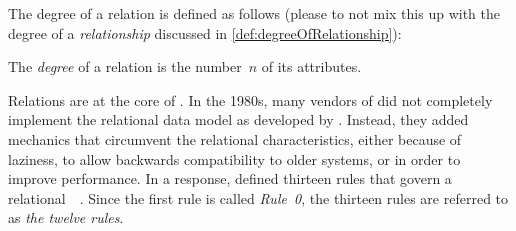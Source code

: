 The degree of a relation is defined as follows (please to not mix this up with the degree of a \emph{relationship} discussed in \cref{def:degreeOfRelationship}):%
%
\begin{definition}%
The \emph{degree} of a relation is the number~$n$ of its attributes.%
\end{definition}%
%
Relations are at the core of .%
%
%
In the 1980s, many vendors of  did not completely implement the relational data model as developed by \citeauthor{C1985IYDRR}.
Instead, they added mechanics that circumvent the relational characteristics, either because of laziness, to allow backwards compatibility to older systems, or in order to improve performance.
In a response, \citeauthor{C1985IYDRR} defined thirteen rules that govern a relational~~\cite{C1985IYDRR,C1986AESFDBMSTACTBR}.
Since the first rule is called \emph{Rule~0}, the thirteen rules are referred to as \emph{the twelve rules}.%
%
